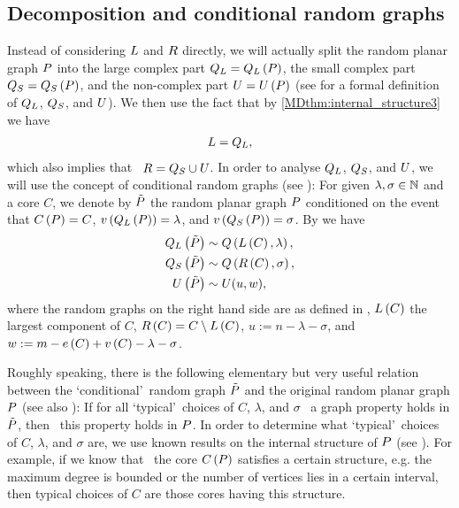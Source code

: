 \subsection{Decomposition and conditional random graphs}\label{MDsub:strategy_decomposition}
Instead of considering $L$ and $R$ directly, we will actually split the random planar graph $P$ into the large complex part $Q_L=Q_L\left(P\right)$, the small complex part $Q_S=Q_S\left(P\right)$, and the non-complex part $U=U\left(P\right)$ (see  for a formal definition of $Q_L$, $Q_S$, and $U$). We then use the fact that by \ref{MDthm:internal_structure3} we have \whp\
\begin{align}\label{MDeq:37}
L=Q_L,
\end{align}
which also implies that \whp\ $R=Q_S \cup U$. In order to analyse $Q_L$, $Q_S$, and $U$, we will use the concept of conditional random graphs (see ): For given $\lambda, \sigma\in \mathbb{N}$ and a core $C$, we denote by $\tilde{P}$ the random planar graph $P$ conditioned on the event that $C\left(P\right)=C$, $v\left({Q_L\left(P\right)}\right)=\lambda$, and $v\left({Q_S\left(P\right)}\right)=\sigma$. By  we have
\begin{align}
Q_L\left(\tilde{P}\right)&\sim Q\left(L\left(C\right),\lambda\right),\label{MDeq:25}\\
Q_S\left(\tilde{P}\right)&\sim Q\left(R\left(C\right),\sigma\right),\label{MDeq:26}\\
U\left(\tilde{P}\right)&\sim U(u,w),\label{MDeq:27}
\end{align}
where the random graphs on the right hand side are as defined in , $L\left(C\right)$ the largest component of $C$, $R\left(C\right)=C\setminus L\left(C\right)$, $u:=n-\lambda-\sigma$, and $w:=m-e\left({C}\right)+v\left({C}\right)-\lambda-\sigma$. 

Roughly speaking, there is the following elementary but very useful relation between the \lq conditional\rq\ random graph $\tilde{P}$ and the original random planar graph $P$ (see also ): If for all \lq typical\rq\ choices of $C$, $\lambda$, and $\sigma$ \whp\ a graph property holds in $\tilde{P}$, then \whp\ this property holds in $P$. In order to determine what \lq typical\rq\ choices of $C$, $\lambda$, and $\sigma$ are, we use known results on the internal structure of $P$ (see ). For example, if we know that \whp\ the core $C\left(P\right)$ satisfies a certain structure, e.g. the maximum degree is bounded or the number of vertices lies in a certain interval, then typical choices of $C$ are those cores having this structure.

